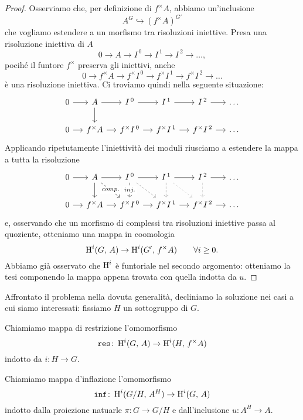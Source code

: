 \begin{proof}
	Osserviamo che, per definizione di $ f^\times A $, abbiamo un'inclusione
	\[ A^G \hookrightarrow \left(f^\times A\right)^{G'} \]
	che vogliamo estendere a un morfismo tra risoluzioni iniettive. Presa una risoluzione iniettiva di $ A $
	\[ 0 \to A \to I^{\,0} \to I^{\,1} \to I^{\,2} \to \dots, \]
	pocihé il funtore $ f^\times $ preserva gli iniettivi, anche
	\[ 0 \to f^\times A \to f^\times I^{\,0} \to f^\times I^{\,1} \to f^\times I^{\,2} \to \dots \]
	è una risoluzione iniettiva. Ci troviamo quindi nella seguente situazione:
	\[\begin{tikzcd}[column sep = small]
	0 \rar
	& A \rar \dar
	& I^{\,0} \rar
	& I^{\,1} \rar
	& I^{\,2} \rar
	& \dots \\
	0 \rar
	& f^\times A  \rar
	& f^\times I^{\,0} \rar 
	& f^\times I^{\,1} \rar 
	& f^\times I^{\, 2} \rar
	& \dots
	\end{tikzcd} \]
	Applicando ripetutamente l'iniettività dei moduli riusciamo a estendere la mappa a tutta la risoluzione 
	\[\begin{tikzcd}[column sep = small]
	0 \rar
	& A \dar \rar \arrow[dashed, "comp." description]{dr}
	& I^{\,0} \rar \dar[dashed, "inj." description] \arrow[dashed, gray]{dr}
	& I^{\,1} \rar \dar[dashed, gray] \arrow[dashed, gray!50]{dr}
	& I^{\,2} \dar[dashed, gray!50] \rar
	& \dots \\
	0 \rar
	& f^\times A \rar
	& f^\times I^{\,0} \rar
	& f^\times I^{\,1} \rar
	& f^\times I^{\,2} \rar
	& \dots
	\end{tikzcd} \]
	e, osservando che un morfismo di complessi tra risoluzioni iniettive passa al quoziente, otteniamo una mappa in coomologia
	\[ \operatorname{H}^i(G, \, A) \to \operatorname{H}^i(G', \, f^\times A) \qquad \forall i \geq 0. \]
	Abbiamo già osservato che $ \operatorname{H}^i $ è funtoriale nel secondo argomento: otteniamo la tesi componendo la mappa appena trovata con quella indotta da $ u $.
\end{proof}

Affrontato il problema nella dovuta generalità, decliniamo la soluzione nei casi a cui siamo interessati: fissiamo $ H $ un sottogruppo di $ G $.
\begin{definition}[Restrizione]
	Chiamiamo mappa di restrizione l'omomorfismo
	\[ \operatorname{\mathtt{res}} \colon \operatorname{H}^i(G, \, A) \to \operatorname{H}^i(H, \, f^\times A) \]
	indotto da $ i \colon H \to G $.
\end{definition}

\begin{definition}[Inflazione]
	Chiamiamo mappa d'inflazione l'omomorfismo
	\[ \operatorname{\mathtt{inf}} \colon \operatorname{H}^i(G/H, \, A^H) \to \operatorname{H}^i(G, \, A) \]
	indotto dalla proiezione natuarle $ \pi \colon G \to G/H $ e dall'inclusione $ u \colon A^H \to A $.
\end{definition}

